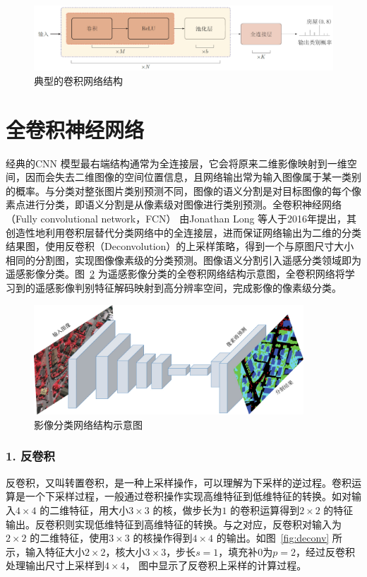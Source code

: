 \begin{figure}[htb]
  \centering
  \includegraphics[width=1.0\textwidth]{figures/cnn_structure}
  \caption{典型的卷积网络结构}\label{fig:cnn_structure}
\end{figure}

\section{全卷积神经网络}
\label{ssec:chap02-2}
经典的CNN 模型最右端结构通常为全连接层，它会将原来二维影像映射到一维空间，因而会失去二维图像的空间位置信息，且网络输出常为输入图像属于某一类别的概率。与分类对整张图片类别预测不同，图像的语义分割是对目标图像的每个像素点进行分类，即语义分割是从像素级对图像进行类别预测。全卷积神经网络（Fully convolutional network，FCN）\cite{long2015fully} 由Jonathan Long 等人于2016年提出，其创造性地利用卷积层替代分类网络中的全连接层，进而保证网络输出为二维的分类结果图，使用反卷积（Deconvolution）的上采样策略，得到一个与原图尺寸大小相同的分割图，实现图像像素级的分类预测。图像语义分割引入遥感分类领域即为遥感影像分类。图~\ref{fig:fcn_structure} 为遥感影像分类的全卷积网络结构示意图，全卷积网络将学习到的遥感影像判别特征解码映射到高分辨率空间，完成影像的像素级分类。

\begin{figure}[htb]
  \centering
  \includegraphics[width=0.9\textwidth]{figures/FCN}
  \caption{影像分类网络结构示意图}\label{fig:fcn_structure}
\end{figure}

\subsubsection*{1. 反卷积}
\label{subsec:chap02-2-2-1}
反卷积，又叫转置卷积，是一种上采样操作，可以理解为下采样的逆过程。卷积运算是一个下采样过程，一般通过卷积操作实现高维特征到低维特征的转换。如对输入$4\times 4$ 的二维特征，用大小$3\times 3$ 的核，做步长为$1$ 的卷积运算得到$2\times 2$ 的特征输出。反卷积则实现低维特征到高维特征的转换。与之对应，反卷积对输入为$2\times 2$ 的二维特征，使用$3\times 3$ 的核操作得到$4\times 4$ 的输出。如图~\ref{fig:deconv} 所示，输入特征大小$2\times 2$，核大小$3\times 3$，步长$s=1$，填充补0为$p=2$，经过反卷积处理输出尺寸上采样到$4\times 4$， 图中显示了反卷积上采样的计算过程。

